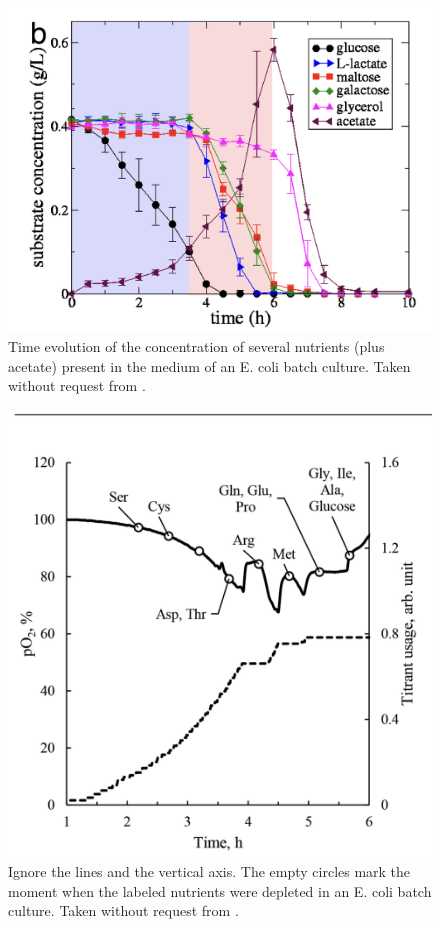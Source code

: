 \documentclass[
10pt, %
a4paper, %
oneside, %
headinclude,footinclude, %
BCOR5mm, %
]{scrartcl}
\begin{document}
\begin{figure}[h]
    \centering
    \includegraphics[width=0.8\columnwidth]{images/begIntracellularCrowdingDefines2007a_carbon_evolution.png}
    \caption[]{
        Time evolution of the concentration of several nutrients (plus acetate) present in the medium of an E. coli batch culture. 
        Taken without request from \cite{begIntracellularCrowdingDefines2007a}.
    }
    \label{fig:begIntracellularCrowdingDefines2007a_carbon_evolution}
\end{figure}

\begin{figure}[h]
    \centering
    \includegraphics[width=0.8\columnwidth]{images/maserAvoidingAminoAcid2019_aa_sequence.png}
    \caption[]{
        Ignore the lines and the vertical axis. 
        The empty circles mark the moment when the labeled nutrients were depleted in an E. coli batch culture.
        Taken without request from \cite{maserAvoidingAminoAcid2019}.
    }
    \label{fig:maserAvoidingAminoAcid2019_aa_sequence}
\end{figure}
\end{document}
